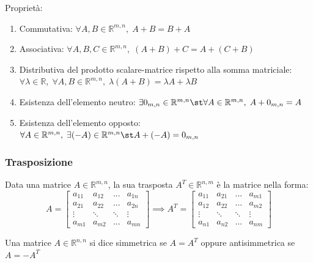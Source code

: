     \vspace{10pt}
    Proprietà:
    \begin{enumerate}[label=(\arabic*)]
        \item Commutativa: $\forall A, B \in \mathbb{R}^{m, n}, \; A + B = B + A$
        \item Associativa: $\forall A, B, C \in \mathbb{R}^{m, n}, \; (A + B) + C = A + (C + B)$
        \item Distributiva del prodotto scalare-matrice rispetto alla somma matriciale: $\forall \lambda \in \mathbb{R}, \; \forall A, B \in \mathbb{R}^{m, n}, \; \lambda(A + B) = \lambda A + \lambda B$
        \item Esistenza dell'elemento neutro: $\exists 0_{m, n} \in \mathbb{R}^{m, n} \st \forall A \in \mathbb{R}^{m, n}, \; A + 0_{m, n} = A $
        \item Esistenza dell'elemento opposto: $\forall A \in \mathbb{R}^{m, n}, \; \exists (-A) \in \mathbb{R}^{m, n} \st A + (-A) = 0_{m, n}$
    \end{enumerate}



\subsubsection{Trasposizione} \label{subsec:mattranspose}
    Data una matrice $A \in \mathbb{R}^{m, n}$, la sua trasposta $A^{T} \in \mathbb{R}^{n, m}$ è la matrice nella forma:
    \[
        A =
        \begin{bmatrix}
            a_{11} & a_{12} & ... & a_{1n} \\
            a_{21} & a_{22} & ... & a_{2n} \\
            \vdots & \ddots & \ddots & \vdots \\
            a_{m1} & a_{m2} & ... & a_{mn}
        \end{bmatrix}
        \implies
        A^{T} =
        \begin{bmatrix}
            a_{11} & a_{21} & ... & a_{m1} \\
            a_{12} & a_{22} & ... & a_{m2} \\
            \vdots & \ddots & \ddots & \vdots \\
            a_{n1} & a_{n2} & ... & a_{nm}
        \end{bmatrix}
    \]


    Una matrice $A \in \mathbb{R}^{n, n}$ si dice simmetrica se $A = A^{T}$ oppure antisimmetrica se $A = -A^{T}$

